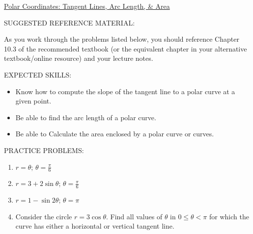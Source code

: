 \documentclass[12pt]{article}
\newif\ifans
\begin{document}
\begin{center}
\underline{\LARGE{Polar Coordinates: Tangent Lines, Arc Length, \& Area}}
\end{center}

\noindent SUGGESTED REFERENCE MATERIAL:

\bigskip

\noindent As you work through the problems listed below, you should reference Chapter 10.3 of the recommended textbook (or the equivalent chapter in your alternative textbook/online resource) and your lecture notes.

\bigskip

\noindent EXPECTED SKILLS:

\begin{itemize}

\item Know how to compute the slope of the tangent line to a polar curve at a given point. 

\item Be able to find the arc length of a polar curve.

\item Be able to Calculate the area enclosed by a polar curve or curves.

\end{itemize}

\noindent PRACTICE PROBLEMS:

\medskip


\begin{enumerate}

\item $r=\theta$; $\theta=\frac{\pi}{6}$ 

\ifans{\fbox{$\frac{\sqrt{3}\pi+6}{6\sqrt{3}-\pi}$}} \fi

\item $r=3+2\sin{\theta}$; $\theta=\frac{\pi}{6}$ 

\ifans{\fbox{$-5\sqrt{3}$}} \fi

\item $r=1-\sin{2\theta}$; $\theta = \pi$ 

\ifans{\fbox{$\frac{1}{2}$}} \fi

\item Consider the circle $r=3\cos{\theta}$.  Find all values of $\theta$ in $0 \leq \theta < \pi$ for which the curve has either a horizontal or vertical tangent line.

\ifans{\fbox{\parbox{1\linewidth}{Vertical Tangent Lines when $\theta=0$ and $\theta=\frac{\pi}{2}$;\\ Horizontal Tangent Lines when $\theta=\frac{\pi}{4}$ or $\theta=\frac{3\pi}{4}$.}}} \fi

\end{enumerate}
\end{document}
